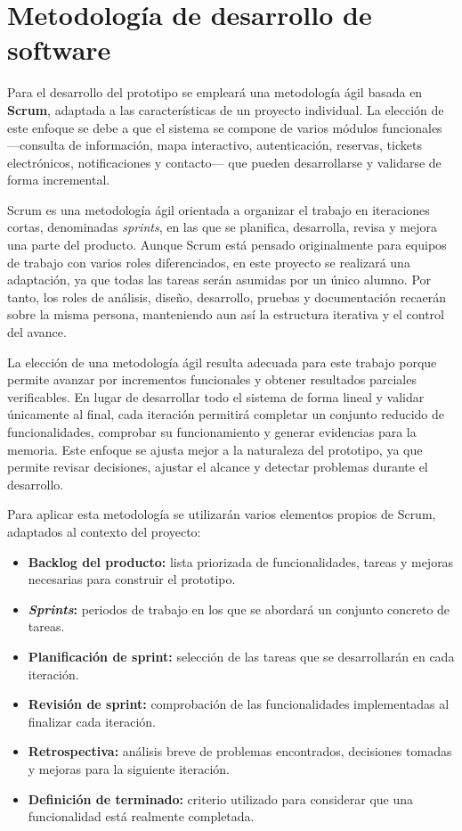 \section{Metodología de desarrollo de software}
\label{sec:metodologia}

Para el desarrollo del prototipo se empleará una metodología ágil basada en \textbf{Scrum}, adaptada a las características de un proyecto individual. La elección de este enfoque se debe a que el sistema se compone de varios módulos funcionales ---consulta de información, mapa interactivo, autenticación, reservas, tickets electrónicos, notificaciones y contacto--- que pueden desarrollarse y validarse de forma incremental.

Scrum es una metodología ágil orientada a organizar el trabajo en iteraciones cortas, denominadas \textit{sprints}, en las que se planifica, desarrolla, revisa y mejora una parte del producto. Aunque Scrum está pensado originalmente para equipos de trabajo con varios roles diferenciados, en este proyecto se realizará una adaptación, ya que todas las tareas serán asumidas por un único alumno. Por tanto, los roles de análisis, diseño, desarrollo, pruebas y documentación recaerán sobre la misma persona, manteniendo aun así la estructura iterativa y el control del avance.

La elección de una metodología ágil resulta adecuada para este trabajo porque permite avanzar por incrementos funcionales y obtener resultados parciales verificables. En lugar de desarrollar todo el sistema de forma lineal y validar únicamente al final, cada iteración permitirá completar un conjunto reducido de funcionalidades, comprobar su funcionamiento y generar evidencias para la memoria. Este enfoque se ajusta mejor a la naturaleza del prototipo, ya que permite revisar decisiones, ajustar el alcance y detectar problemas durante el desarrollo.

Para aplicar esta metodología se utilizarán varios elementos propios de Scrum, adaptados al contexto del proyecto:

\begin{itemize}
    \item \textbf{Backlog del producto:} lista priorizada de funcionalidades, tareas y mejoras necesarias para construir el prototipo.
    \item \textbf{\textit{Sprints}:} periodos de trabajo en los que se abordará un conjunto concreto de tareas.
    \item \textbf{Planificación de sprint:} selección de las tareas que se desarrollarán en cada iteración.
    \item \textbf{Revisión de sprint:} comprobación de las funcionalidades implementadas al finalizar cada iteración.
    \item \textbf{Retrospectiva:} análisis breve de problemas encontrados, decisiones tomadas y mejoras para la siguiente iteración.
    \item \textbf{Definición de terminado:} criterio utilizado para considerar que una funcionalidad está realmente completada.
\end{itemize}

